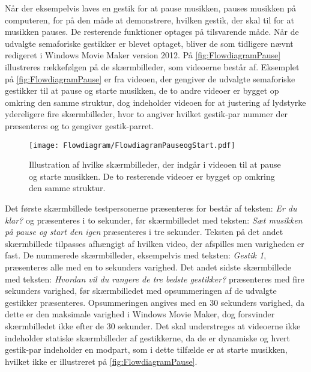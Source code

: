 Når der eksempelvis laves en gestik for at pause musikken, pauses musikken på computeren, for på den måde at demonstrere, hvilken gestik, der skal til for at musikken pauses. De resterende funktioner optages på tilsvarende måde.\blankline
%
Når de udvalgte semaforiske gestikker er blevet optaget, bliver de som tidligere nævnt redigeret i Windows Movie Maker version 2012. På \autoref{fig:FlowdiagramPause} illustreres rækkefølgen på de skærmbilleder, som videoerne består af. Eksemplet på \autoref{fig:FlowdiagramPause} er fra videoen, der gengiver de udvalgte semaforiske gestikker til at pause og starte musikken, de to andre videoer er bygget op omkring den samme struktur, dog indeholder videoen for at justering af lydstyrke ydereligere fire skærmbilleder, hvor to angiver hvilket gestik-par nummer der præsenteres og to gengiver gestik-parret.       
%
\begin{figure}[H]
	\centering
	\texttt{[image: Flowdiagram/FlowdiagramPauseogStart.pdf]}
	\caption{Illustration af hvilke skærmbilleder, der indgår i videoen til at pause og starte musikken. De to resterende videoer er bygget op omkring den samme struktur.}
	\label{fig:FlowdiagramPause}
\end{figure}
\noindent
%
Det første skærmbillede testpersonerne præsenteres for består af teksten: \textit{Er du klar?} og præsenteres i to sekunder, før skærmbilledet med teksten: \textit{Sæt musikken på pause og start den igen} præsenteres i tre sekunder. Teksten på det andet skærmbillede tilpasses afhængigt af hvilken video, der afspilles men varigheden er fast. De nummerede skærmbilleder, eksempelvis med teksten: \textit{Gestik 1}, præsenteres alle med en to sekunders varighed. Det andet sidste skærmbillede med teksten: \textit{Hvordan vil du rangere de tre bedste gestikker?} præsenteres med fire sekunders varighed, før skærmbilledet med opsummeringen af de udvalgte gestikker præsenteres. Opsummeringen angives med en 30 sekunders varighed, da dette er den maksimale varighed i Windows Movie Maker, dog forsvinder skærmbilledet ikke efter de 30 sekunder. Det skal understreges at videoerne ikke indeholder statiske skærmbilleder af gestikkerne, da de er dynamiske og hvert gestik-par indeholder en modpart, som i dette tilfælde er at starte musikken, hvilket ikke er illustreret på \autoref{fig:FlowdiagramPause}.

